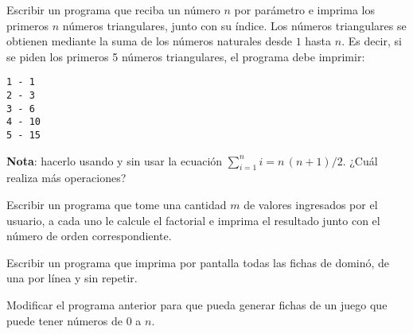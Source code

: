 \begin{ejercicio}
Escribir un programa que reciba un número $n$ por
parámetro e imprima los primeros $n$ números triangulares, junto con su
índice. Los números triangulares se obtienen mediante la suma de los números
naturales desde $1$ hasta $n$.  Es decir, si se piden los primeros 5
números triangulares, el programa debe imprimir:

\begin{verbatim}
1 - 1
2 - 3
3 - 6
4 - 10
5 - 15
\end{verbatim}

{\bf Nota}: hacerlo usando y sin usar la ecuación $\sum_{i=1}^n i = n\,(n+1)/2$.
¿Cuál realiza más operaciones?
\end{ejercicio}

\begin{ejercicio}
Escribir un programa que tome una cantidad $m$ de valores ingresados
por el usuario, a cada uno le calcule el factorial e imprima el resultado
junto con el número de orden correspondiente.
\end{ejercicio}

\begin{ejercicio}
Escribir un programa que imprima por pantalla todas las fichas de dominó, de
una por línea y sin repetir.
\end{ejercicio}

\begin{ejercicio}
Modificar el programa anterior para que pueda generar fichas de un juego
que puede tener números de 0 a $n$.
\end{ejercicio}
